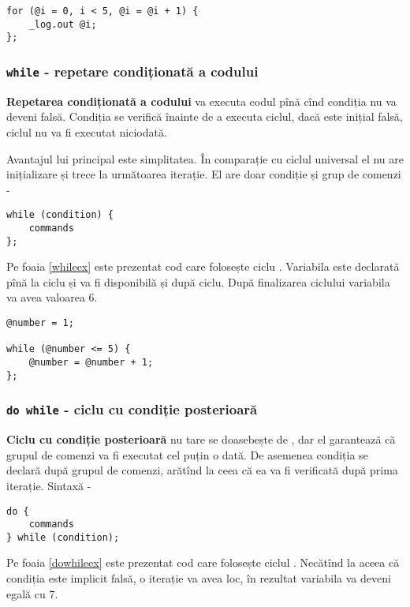 \begin{lstlisting}[caption=Ciclu universal, label=uniloopex]
for (@i = 0, i < 5, @i = @i + 1) {
	_log.out @i;
};
\end{lstlisting}

\subsubsection{\lstinline`while` - repetare condiționată a codului}

{\bf Repetarea condiționată a codului} va executa codul pînă cînd condiția nu va deveni falsă. Condiția se verifică înainte de a executa ciclul, dacă este inițial falsă, ciclul nu va fi executat niciodată.

Avantajul lui principal este simplitatea. În comparație cu ciclul universal el nu are inițializare și trece la următoarea iterație. El are doar condiție și grup de comenzi -
\begin{lstlisting}[numbers=none]
while (condition) {
	commands
};
\end{lstlisting}

Pe foaia \ref{whileex} este prezentat cod care folosește ciclu . Variabila  este declarată pînă la ciclu și va fi disponibilă și după ciclu. După finalizarea ciclului variabila  va avea valoarea 6.

\begin{lstlisting}[caption=Ciclu while, label=whileex]
@number = 1;

while (@number <= 5) {
	@number = @number + 1;
};
\end{lstlisting}

\subsubsection{\lstinline`do while` - ciclu cu condiție posterioară}

{\bf Ciclu cu condiție posterioară} nu tare se doasebește de , dar el garantează că grupul de comenzi va fi executat cel puțin o dată. De asemenea condiția se declară după grupul de comenzi, arătînd la ceea că ea va fi verificată după prima iterație. Sintaxă -
\begin{lstlisting}[numbers=none]
do {
	commands
} while (condition);
\end{lstlisting}

Pe foaia \ref{dowhileex} este prezentat cod care folosește ciclul . Necătînd la aceea că condiția este implicit falsă, o iterație va avea loc, în rezultat variabila  va deveni egală cu 7.

